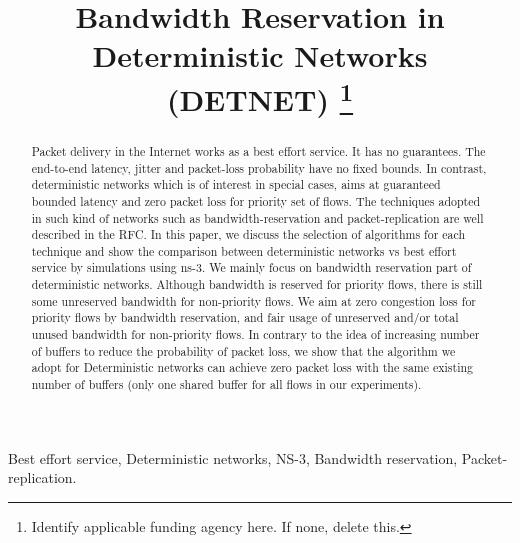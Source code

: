 \documentclass[conference]{IEEEtran}
\begin{document}
\title{Bandwidth Reservation in Deterministic Networks (DETNET)
\thanks{Identify applicable funding agency here. If none, delete this.}
}

\author{
\and
{}

}

\maketitle

\begin{abstract}
Packet delivery in the Internet works as a best effort service. It has no guarantees. The end-to-end latency, jitter and packet-loss probability have no fixed bounds. In contrast, deterministic networks which is of interest in special cases, aims at guaranteed bounded latency and zero packet loss for priority set of flows. The techniques adopted in such kind of networks such as bandwidth-reservation and packet-replication are well described in the RFC. In this paper, we discuss the selection of algorithms for each technique and show the comparison between deterministic networks vs best effort service by simulations using ns-3. We mainly focus on bandwidth reservation part of deterministic networks. Although bandwidth is reserved for priority flows, there is still some unreserved bandwidth for non-priority flows. We aim at zero congestion loss for priority flows by bandwidth reservation, and fair usage of unreserved and/or total unused bandwidth for non-priority flows. In contrary to the idea of increasing number of buffers to reduce the probability of packet loss, we show that the algorithm we adopt for Deterministic networks can achieve zero packet loss with the same existing number of buffers (only one shared buffer for all flows in our experiments). 
\end{abstract}

\begin{IEEEkeywords}
Best effort service, Deterministic networks, NS-3, Bandwidth reservation, Packet-replication.
\end{IEEEkeywords}
\end{document}

